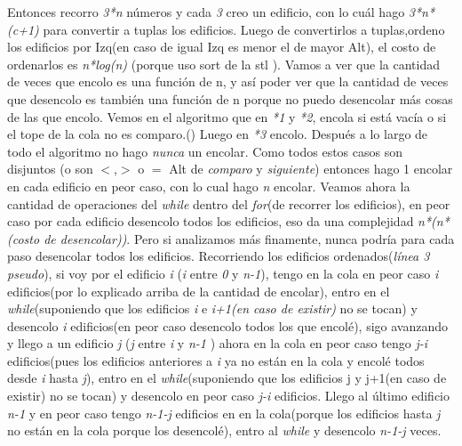 \documentclass{article}
\begin{document}
Entonces recorro \textit{3*n} números y cada \textit{3} creo un edificio, con lo cuál hago \textit{3*n*(c+1)} para convertir a tuplas los edificios.\newline
Luego de convertirlos a tuplas,ordeno los edificios por Izq(en caso de igual Izq es menor el de mayor Alt), el costo de ordenarlos es \textit{n*log(n)} (porque uso sort de la stl \color{red}{según este link} \color{black}).\newline
Vamos a ver que la cantidad de veces que encolo es una función de n, y así poder ver que la cantidad de veces que desencolo es también una función de n porque no puedo desencolar más cosas de las que encolo.
Vemos en el algoritmo que en  \textit{*1} y \textit{*2}, encola si está vacía o si el tope de la cola no es comparo.(\color{red}{falta demostrar que si quiero encolar un elemento 2 veces el que quiero encolar de nuevo está en el tope, la idea la había sacado angel})\color{black} Luego en \textit{*3} encolo. Después a lo largo de todo el algoritmo no hago \textit{nunca} un encolar.\newline
Como todos estos casos son disjuntos (o son $<$,$>$ o $=$ Alt de \textit{comparo} y \textit{siguiente}) entonces hago 1 encolar en cada edificio en peor caso, con lo cual hago \textit{n} encolar. 
\newline
Veamos ahora la cantidad de operaciones del \textit{while} dentro del \textit{for}(de recorrer los edificios), en peor caso por cada edificio desencolo todos los edificios, eso da una complejidad \textit{n*(n*(costo de desencolar))}. Pero si analizamos más finamente, nunca podría para cada paso desencolar todos los edificios.\newline
Recorriendo los edificios ordenados(\textit{línea 3 pseudo}), si voy por el edificio \textit{i} (\textit{i} entre \textit{0} y \textit{n-1}), tengo en la cola en peor caso \textit{i} edificios(por lo explicado arriba de la cantidad de encolar), entro en el \textit{while}(suponiendo que los edificios \textit{i} e \textit{i+1(en caso de existir)} no se tocan) y desencolo \textit{i} edificios(en peor caso desencolo todos los que encolé), sigo avanzando y llego a un edificio \textit{j} (\textit{j} entre \textit{i} y \textit{n-1} ) ahora en la cola en peor caso tengo \textit{j-i} edificios(pues los edificios anteriores a \textit{i} ya no están en la cola y encolé todos desde \textit{i} hasta \textit{j}), entro en el \textit{while}(suponiendo que los edificios j y j+1(en caso de existir) no se tocan) y desencolo en peor caso \textit{j-i} edificios.
Llego al último edificio \textit{n-1} y en peor caso tengo \textit{n-1-j} edificios en en la cola(porque los edificios hasta \textit{j} no están en la cola porque los desencolé), entro al \textit{while} y desencolo \textit{n-1-j} veces.\newline
\end{document}
